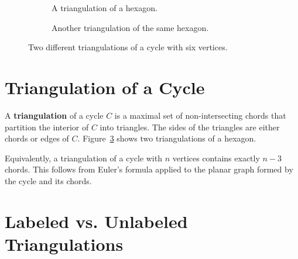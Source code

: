 \begin{figure}[htbp]
    \centering
    \begin{subfigure}{0.45\textwidth}
        \centering
        \caption{A triangulation of a hexagon.}
        \label{fig:triangulation_hex1}
    \end{subfigure}
    \hfill
    \begin{subfigure}{0.45\textwidth}
        \centering
        \caption{Another triangulation of the same hexagon.}
        \label{fig:triangulation_hex2}
    \end{subfigure}
    \caption{Two different triangulations of a cycle with six vertices.}
    \label{fig:triangulations_of_cycle}
\end{figure}

\section{Triangulation of a Cycle}
\label{sec:triangulation_cycle}

A \textbf{triangulation} of a cycle \(C\) is a maximal set of non-intersecting chords that partition the interior of \(C\) into triangles. 
The sides of the triangles are either chords or edges of \(C\). 
Figure~\ref{fig:triangulations_of_cycle} shows two triangulations of a hexagon.

Equivalently, a triangulation of a cycle with \(n\) vertices contains exactly \(n-3\) chords. 
This follows from Euler’s formula applied to the planar graph formed by the cycle and its chords.

\section{Labeled vs. Unlabeled Triangulations}
\label{sec:labeled_unlabeled}

